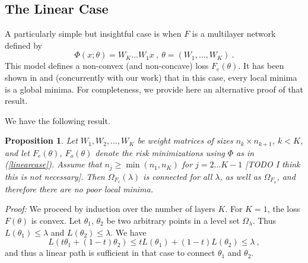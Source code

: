 \documentclass{article} %
\newcommand {\Fem} {F_{e}}
\newcommand {\Forr} {F_{o}}
\newtheorem{proposition}[theorem]{Proposition}
\begin{document}
\subsection{The Linear Case}

A particularly simple but insightful case is 
when $F$ is a multilayer network defined by
\begin{equation}
\label{linearcase}
\Phi(x;\theta) = W_K \dots W_1 x~,~\theta = (W_1, \dots, W_K)~.
\end{equation}
This model defines a non-convex (and non-concave) loss $\Fem(\theta)$.
It has been shown in \cite{ganguli} and \cite{linearcase} (concurrently with our work) that in this case, 
every local minima is a global minima.  
For completeness, we provide here an alternative proof of that result.


We have the following result.
\begin{proposition}
\label{proplinear}
Let $W_1, W_2, \dots, W_K$ be weight matrices of sizes 
$n_k \times n_{k+1}$, $k < K$, and let $\Fem(\theta)$, $\Forr(\theta)$ 
denote the risk minimizations using $\Phi$ as in (\ref{linearcase}).
Assume that $n_j \geq \min(n_1, n_K)$ for $j=2 \dots K-1$ [TODO I think this is not necessary].
Then $\Omega_{\Fem}(\lambda)$ is connected for all $\lambda$, as well as $\Omega_{\Forr}$, 
and therefore there are no poor local minima.  
\end{proposition}
{\it Proof:} We proceed by induction over the number of layers $K$. 
For $K=1$, the loss $F(\theta)$ is convex. Let  $\theta_1$, $\theta_2$ be two arbitrary points 
in a level set $\Omega_\lambda$. Thus $L(\theta_1) \leq \lambda$ and $L(\theta_2) \leq \lambda$. We have
$$L( t \theta_1 + (1-t) \theta_2) \leq t L(\theta_1) + (1-t) L(\theta_2) \leq \lambda~,$$
and thus a linear path is sufficient in that case to connect $\theta_1$ and $\theta_2$.
\end{document}
